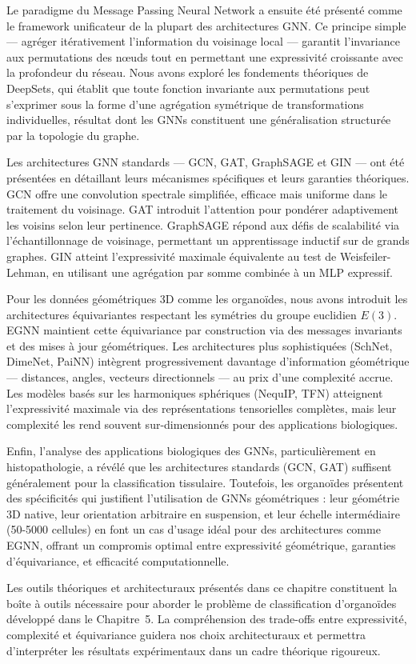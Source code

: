 Le paradigme du Message Passing Neural Network a ensuite été présenté comme le framework unificateur de la plupart des architectures GNN. Ce principe simple — agréger itérativement l'information du voisinage local — garantit l'invariance aux permutations des nœuds tout en permettant une expressivité croissante avec la profondeur du réseau. Nous avons exploré les fondements théoriques de DeepSets, qui établit que toute fonction invariante aux permutations peut s'exprimer sous la forme d'une agrégation symétrique de transformations individuelles, résultat dont les GNNs constituent une généralisation structurée par la topologie du graphe.

Les architectures GNN standards — GCN, GAT, GraphSAGE et GIN — ont été présentées en détaillant leurs mécanismes spécifiques et leurs garanties théoriques. GCN offre une convolution spectrale simplifiée, efficace mais uniforme dans le traitement du voisinage. GAT introduit l'attention pour pondérer adaptivement les voisins selon leur pertinence. GraphSAGE répond aux défis de scalabilité via l'échantillonnage de voisinage, permettant un apprentissage inductif sur de grands graphes. GIN atteint l'expressivité maximale équivalente au test de Weisfeiler-Lehman, en utilisant une agrégation par somme combinée à un MLP expressif.

Pour les données géométriques 3D comme les organoïdes, nous avons introduit les architectures équivariantes respectant les symétries du groupe euclidien $E(3)$. EGNN maintient cette équivariance par construction via des messages invariants et des mises à jour géométriques. Les architectures plus sophistiquées (SchNet, DimeNet, PaiNN) intègrent progressivement davantage d'information géométrique — distances, angles, vecteurs directionnels — au prix d'une complexité accrue. Les modèles basés sur les harmoniques sphériques (NequIP, TFN) atteignent l'expressivité maximale via des représentations tensorielles complètes, mais leur complexité les rend souvent sur-dimensionnés pour des applications biologiques.

Enfin, l'analyse des applications biologiques des GNNs, particulièrement en histopathologie, a révélé que les architectures standards (GCN, GAT) suffisent généralement pour la classification tissulaire. Toutefois, les organoïdes présentent des spécificités qui justifient l'utilisation de GNNs géométriques : leur géométrie 3D native, leur orientation arbitraire en suspension, et leur échelle intermédiaire (50-5000 cellules) en font un cas d'usage idéal pour des architectures comme EGNN, offrant un compromis optimal entre expressivité géométrique, garanties d'équivariance, et efficacité computationnelle.

Les outils théoriques et architecturaux présentés dans ce chapitre constituent la boîte à outils nécessaire pour aborder le problème de classification d'organoïdes développé dans le Chapitre~5. La compréhension des trade-offs entre expressivité, complexité et équivariance guidera nos choix architecturaux et permettra d'interpréter les résultats expérimentaux dans un cadre théorique rigoureux.